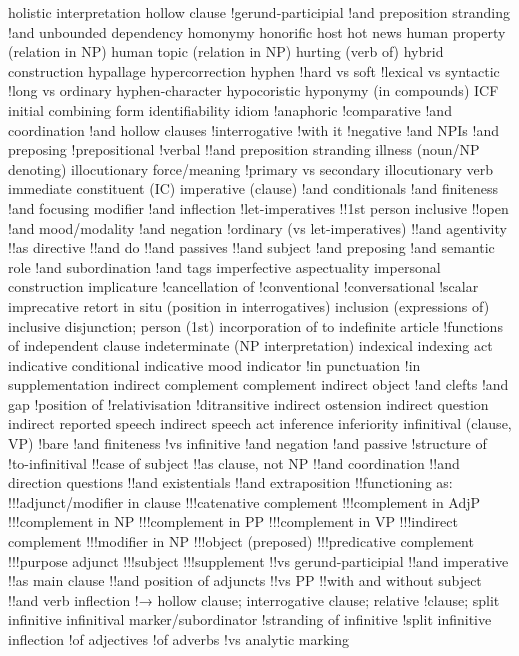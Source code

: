 holistic interpretation
hollow clause
!gerund-participial
!and preposition stranding
!and unbounded dependency
homonymy
honorific
host
hot news
human property (relation in NP)
human topic (relation in NP)
hurting (verb of)
hybrid construction
hypallage
hypercorrection
hyphen
!hard vs soft
!lexical vs syntactic
!long vs ordinary
hyphen-character
hypocoristic
hyponymy (in compounds)
ICF initial combining form
identifiability
idiom
!anaphoric
!comparative
!and coordination
!and hollow clauses
!interrogative
!with it
!negative
!and NPIs
!and preposing
!prepositional
!verbal
!!and preposition stranding
illness (noun/NP denoting)
illocutionary force/meaning
!primary vs secondary
illocutionary verb
immediate constituent (IC)
imperative (clause)
!and conditionals
!and finiteness
!and focusing modifier
!and inflection
!let-imperatives
!!1st person inclusive
!!open
!and mood/modality
!and negation
!ordinary (vs let-imperatives)
!!and agentivity
!!as directive
!!and do
!!and passives
!!and subject
!and preposing
!and semantic role
!and subordination
!and tags
imperfective aspectuality
impersonal construction
implicature
!cancellation of
!conventional
!conversational
!scalar
imprecative retort
in situ (position in interrogatives)
inclusion (expressions of)
inclusive disjunction; person (1st)
incorporation of to
indefinite article
!functions of
independent clause
indeterminate (NP interpretation)
indexical
indexing act
indicative conditional
indicative mood
indicator
!in punctuation
!in supplementation
indirect complement complement
indirect object
!and clefts
!and gap
!position of
!relativisation
!ditransitive
indirect ostension
indirect question
indirect reported speech
indirect speech act
inference
inferiority
infinitival (clause, VP)
!bare
!and finiteness
!vs infinitive
!and negation
!and passive
!structure of
!to-infinitival
!!case of subject
!!as clause, not NP
!!and coordination
!!and direction questions
!!and existentials
!!and extraposition
!!functioning as:
!!!adjunct/modifier in clause
!!!catenative complement
!!!complement in AdjP
!!!complement in NP
!!!complement in PP
!!!complement in VP
!!!indirect complement
!!!modifier in NP
!!!object (preposed)
!!!predicative complement
!!!purpose adjunct
!!!subject
!!!supplement
!!vs gerund-participial
!!and imperative
!!as main clause
!!and position of adjuncts
!!vs PP
!!with and without subject
!!and verb inflection
!→ hollow clause; interrogative clause; relative
!clause; split infinitive
infinitival marker/subordinator
!stranding of
infinitive
!split infinitive
inflection
!of adjectives
!of adverbs
!vs analytic marking
